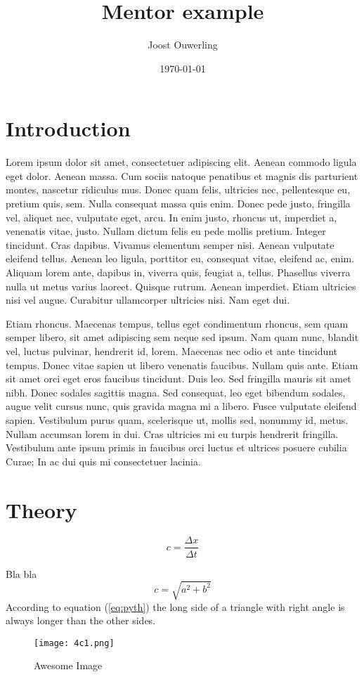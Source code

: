 \documentclass[a4paper]{article}
\title{Mentor example}
\author{Joost Ouwerling}
\date{\today}
\begin{document}
\maketitle
\clearpage

\tableofcontents
\clearpage

\section{Introduction}
Lorem ipsum dolor sit amet, consectetuer adipiscing elit. Aenean commodo ligula eget dolor. Aenean massa. Cum sociis natoque penatibus et magnis dis parturient montes, nascetur ridiculus mus. Donec quam felis, ultricies nec, pellentesque eu, pretium quis, sem. Nulla consequat massa quis enim. Donec pede justo, fringilla vel, aliquet nec, vulputate eget, arcu. In enim justo, rhoncus ut, imperdiet a, venenatis vitae, justo. Nullam dictum felis eu pede mollis pretium. Integer tincidunt. Cras dapibus. Vivamus elementum semper nisi. Aenean vulputate eleifend tellus. Aenean leo ligula, porttitor eu, consequat vitae, eleifend ac, enim. Aliquam lorem ante, dapibus in, viverra quis, feugiat a, tellus. Phasellus viverra nulla ut metus varius laoreet. Quisque rutrum. Aenean imperdiet. Etiam ultricies nisi vel augue. Curabitur ullamcorper ultricies nisi. Nam eget dui.

Etiam rhoncus. Maecenas tempus, tellus eget condimentum rhoncus, sem quam semper libero, sit amet adipiscing sem neque sed ipsum. Nam quam nunc, blandit vel, luctus pulvinar, hendrerit id, lorem. Maecenas nec odio et ante tincidunt tempus. Donec vitae sapien ut libero venenatis faucibus. Nullam quis ante. Etiam sit amet orci eget eros faucibus tincidunt. Duis leo. Sed fringilla mauris sit amet nibh. Donec sodales sagittis magna. Sed consequat, leo eget bibendum sodales, augue velit cursus nunc, quis gravida magna mi a libero. Fusce vulputate eleifend sapien. Vestibulum purus quam, scelerisque ut, mollis sed, nonummy id, metus. Nullam accumsan lorem in dui. Cras ultricies mi eu turpis hendrerit fringilla. Vestibulum ante ipsum primis in faucibus orci luctus et ultrices posuere cubilia Curae; In ac dui quis mi consectetuer lacinia.

\clearpage

\section{Theory}
\begin{equation}
    c = \frac{\Delta x}{\Delta t}
\end{equation}

Bla bla 
\begin{equation}
    c = \sqrt{a^2 + b^2}
    \label{eq:pyth}
\end{equation}
According to equation (\ref{eq:pyth}) the long side of a triangle with right angle is always longer than the other sides.


\begin{figure}[p]
    \centering
    \texttt{[image: 4c1.png]}
    \caption{Awesome Image}
    \label{fig:4c1}
\end{figure}
\end{document}
